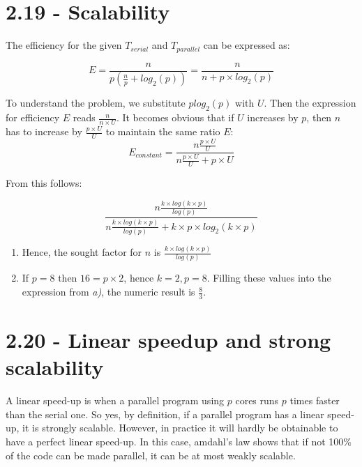 \documentclass[a4paper,11pt,twoside]{article}
\begin{document}
\section{2.19 - Scalability}
The efficiency for the given $T_{serial}$ and $T_{parallel}$ can be expressed as:

\begin{equation*}
E = \frac{n}{p (\frac{n}{p} + log_{2}(p))} = \frac{n}{n + p \times log_{2}(p)}   
\end{equation*}

To understand the problem, we substitute $p log_{2}(p)$ with $U$. Then the expression for efficiency $E$ reads $\frac{n}{n \times U}$. It becomes obvious that if $U$ increases by $p$, then $n$ has to increase by $\frac{p \times U}{U}$ to maintain the same ratio $E$:
\begin{equation*}
E_{constant} = \frac{n \frac{p \times U}{U}}{n \frac{p \times U}{U} + {p \times U}}
\end{equation*}

From this follows:

\begin{equation*}
\frac{n\frac{k \times log(k\times p)}{log(p)}}{n \frac{k \times log(k \times p)}{log(p)} + k \times p \times log_{2}(k \times p)}
\end{equation*}


\begin{enumerate}[label={\alph*)}]
\item Hence, the sought factor for $n$ is $\frac{k \times log(k\times p)}{log(p)}$

\item If $p = 8$ then $16 = p \times 2$, hence $k = 2, p = 8$. Filling these values into the expression from \textit{a)}, the numeric result is $\frac{8}{3}$.
  
\end{enumerate}


\section{2.20 - Linear speedup and strong scalability}
A linear speed-up is when a parallel program using $p$ cores runs $p$ times faster than the serial one. So yes, by definition, if a parallel program has a linear speed-up, it is strongly scalable. However, in practice it will hardly be obtainable to have a perfect linear speed-up. In this case, amdahl's law shows that if not 100\% of the code can be made parallel, it can be at most weakly scalable.
\end{document}
